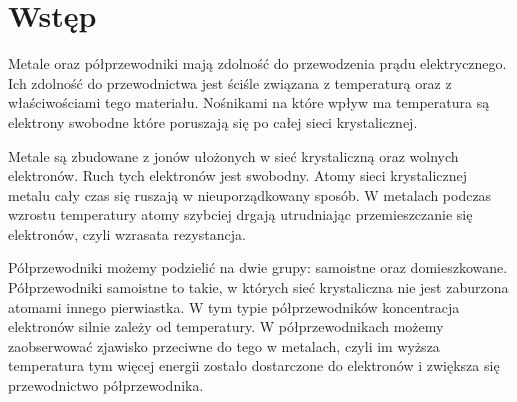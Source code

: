 \section{Wstęp}
Metale oraz półprzewodniki mają zdolność do przewodzenia prądu elektrycznego. Ich zdolność do przewodnictwa jest ściśle związana z temperaturą oraz z właściwościami tego materiału. Nośnikami na które wpływ ma temperatura są elektrony swobodne które poruszają się po całej sieci krystalicznej.

Metale są zbudowane z jonów ułożonych w sieć krystaliczną  oraz wolnych elektronów. Ruch tych elektronów jest swobodny. Atomy sieci krystalicznej metalu cały czas się ruszają w nieuporządkowany sposób. W metalach podczas wzrostu temperatury atomy szybciej drgają utrudniając przemieszczanie się elektronów, czyli wzrasata rezystancja.

Półprzewodniki możemy podzielić na dwie grupy: samoistne oraz domieszkowane. Półprzewodniki samoistne to takie, w których sieć krystaliczna nie jest zaburzona atomami innego pierwiastka. W tym typie półprzewodników koncentracja elektronów silnie zależy od temperatury. W półprzewodnikach możemy zaobserwować zjawisko przeciwne do tego w metalach, czyli im wyższa temperatura tym więcej energii zostało dostarczone do elektronów i zwiększa się przewodnictwo półprzewodnika.
